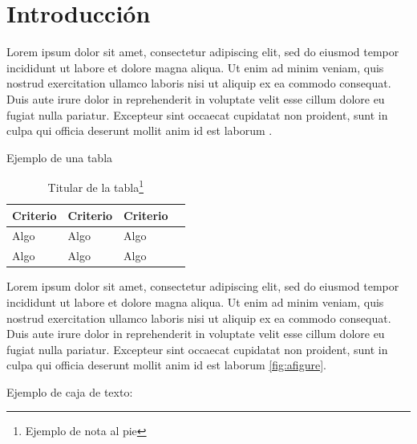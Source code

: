 
\chapter*{Introducción}

Lorem ipsum dolor sit amet, consectetur adipiscing elit, sed do eiusmod tempor incididunt ut labore et dolore magna aliqua. Ut enim ad minim veniam, quis nostrud exercitation ullamco laboris nisi ut aliquip ex ea commodo consequat. Duis aute irure dolor in reprehenderit in voluptate velit esse cillum dolore eu fugiat nulla pariatur. Excepteur sint occaecat cupidatat non proident, sunt in culpa qui officia deserunt mollit anim id est laborum \cite{noauthor_algo_2019}.

Ejemplo de una tabla

\begin{table}[ht] 
	\centering 
	\begin{tabular}{ | l | l | l | p{5cm} |}
		\hline
		\textbf{Criterio} & \textbf{Criterio} & \textbf{Criterio} \\ \hline
		Algo & Algo & Algo  \\ \hline
		Algo & Algo & Algo  \\
		\hline
	\end{tabular}
	\caption[Titular de la tabla]{Titular de la tabla\footnote{Ejemplo de nota al pie}}
	\label{table:atable}
\end{table} 

Lorem ipsum dolor sit amet, consectetur adipiscing elit, sed do eiusmod tempor incididunt ut labore et dolore magna aliqua. Ut enim ad minim veniam, quis nostrud exercitation ullamco laboris nisi ut aliquip ex ea commodo consequat. Duis aute irure dolor in reprehenderit in voluptate velit esse cillum dolore eu fugiat nulla pariatur. Excepteur sint occaecat cupidatat non proident, sunt in culpa qui officia deserunt mollit anim id est laborum \ref{fig:afigure}.

Ejemplo de caja de texto:

\begin{center}
	{ \fboxsep 8pt
		 }
	\end{center}


